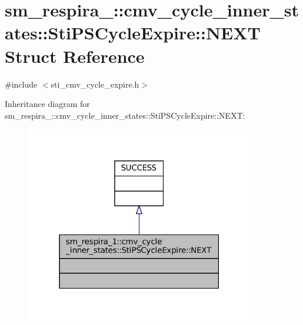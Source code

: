 \hypertarget{structsm__respira__1_1_1cmv__cycle__inner__states_1_1StiPSCycleExpire_1_1NEXT}{}\section{sm\+\_\+respira\+\_\+:\+:cmv\+\_\+cycle\+\_\+inner\+\_\+states\+:\+:Sti\+P\+S\+Cycle\+Expire\+:\+:N\+E\+XT Struct Reference}
\label{structsm__respira__1_1_1cmv__cycle__inner__states_1_1StiPSCycleExpire_1_1NEXT}


{\ttfamily \#include $<$sti\+\_\+cmv\+\_\+cycle\+\_\+expire.\+h$>$}



Inheritance diagram for sm\+\_\+respira\+\_\+:\+:cmv\+\_\+cycle\+\_\+inner\+\_\+states\+:\+:Sti\+P\+S\+Cycle\+Expire\+:\+:N\+E\+XT\+:
\nopagebreak
\begin{figure}[H]
\begin{center}
\leavevmode
\includegraphics[width=283pt]{structsm__respira__1_1_1cmv__cycle__inner__states_1_1StiPSCycleExpire_1_1NEXT__inherit__graph}
\end{center}
\end{figure}


